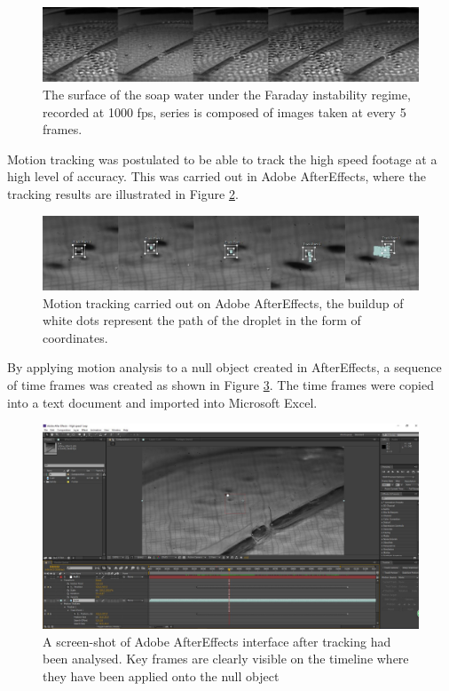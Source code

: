 \begin{figure}[htb]
\includegraphics[width=\textwidth]{prototype/exp_rep_imgs/highspeed_faraday.jpg}
\centering
\caption{The surface of the soap water under the Faraday instability regime, recorded at 1000 fps, series is composed of images taken at every 5 frames.}
\centering
\label{fig:highspeed_faraday}
\end{figure}

Motion tracking was postulated to be able to track the high speed footage at a high level of accuracy. This was carried out in Adobe AfterEffects, where the tracking results are illustrated in Figure \ref{fig:tracking_droplet}.

\begin{figure}[htb]
\includegraphics[width=\textwidth]{prototype/exp_rep_imgs/tracking_droplet.jpg}
\centering
\caption{Motion tracking carried out on Adobe AfterEffects, the buildup of white dots represent the path of the droplet in the form of coordinates.}
\centering
\label{fig:tracking_droplet}
\end{figure}

By applying motion analysis to a null object created in AfterEffects,  a sequence of time frames was created as shown in Figure \ref{fig:after_effects_interface}. The time frames were copied into a text document and imported into Microsoft Excel.

\begin{figure}[htb]
\includegraphics[width=\textwidth]{prototype/exp_rep_imgs/after_effects_interface}
\centering
\caption{A screen-shot of Adobe AfterEffects interface after tracking had been analysed. Key frames are clearly visible on the timeline where they have been applied onto the null object}
\centering
\label{fig:after_effects_interface}
\end{figure}

